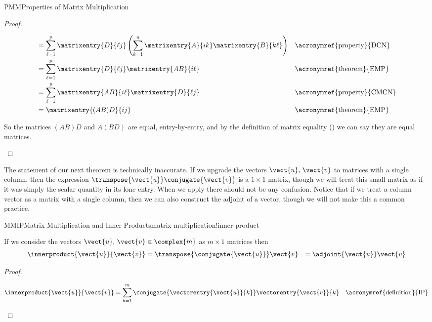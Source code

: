 \begin{subsect}{PMM}{Properties of Matrix Multiplication}
\begin{proof}
\begin{para}
\begin{align*}
%
&=\sum_{\ell=1}^{p}\matrixentry{D}{\ell j}\left(\sum_{k=1}^{n}\matrixentry{A}{ik}\matrixentry{B}{k\ell}\right)
&&\text{\acronymref{property}{DCN}}\\
&=\sum_{\ell=1}^{p}\matrixentry{D}{\ell j}\matrixentry{AB}{i\ell}
&&\text{\acronymref{theorem}{EMP}}\\
&=\sum_{\ell=1}^{p}\matrixentry{AB}{i\ell}\matrixentry{D}{\ell j}
&&\text{\acronymref{property}{CMCN}}\\
&=\matrixentry{(AB)D}{ij}&&\text{\acronymref{theorem}{EMP}}
\end{align*}
\end{para}
%
\begin{para}So the matrices $(AB)D$ and $A(BD)$ are equal, entry-by-entry, and by the definition of matrix equality () we can say they are equal matrices.\end{para}
%
\end{proof}
%
\begin{para}The statement of our next theorem is technically inaccurate.  If we upgrade the vectors $\vect{u},\,\vect{v}$ to matrices with a single column, then the expression $\transpose{\vect{u}}\conjugate{\vect{v}}$ is a $1\times 1$ matrix, though we will treat this small matrix as if it was simply the scalar quantity in its lone entry.  When we apply  there should not be any confusion.  Notice that if we treat a column vector as a matrix with a single column, then we can also construct the adjoint of a vector, though we will not make this a common practice.\end{para}
%
\begin{theorem}{MMIP}{Matrix Multiplication and Inner Products}{matrix multiplication!inner product}
\begin{para}If we consider the vectors $\vect{u},\,\vect{v}\in\complex{m}$ as $m\times 1$ matrices then
%
\begin{align*}
\innerproduct{\vect{u}}{\vect{v}}
&=\transpose{\conjugate{\vect{u}}}\vect{v}
&=\adjoint{\vect{u}}\vect{v}
\end{align*}
\end{para}
%
\end{theorem}
%
\begin{proof}
%
\begin{para}
\begin{align*}
\innerproduct{\vect{u}}{\vect{v}}
%
&=\sum_{k=1}^{m}\conjugate{\vectorentry{\vect{u}}{k}}\vectorentry{\vect{v}}{k}
&&\text{\acronymref{definition}{IP}}\\

\end{align*}
\end{para}
\end{proof}
\end{subsect}
